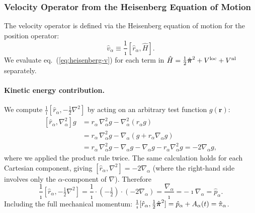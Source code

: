 \subsubsection{Velocity Operator from the Heisenberg Equation of Motion}
\label{sec:velocity-eom}

The velocity operator is defined via the Heisenberg equation of
motion for the position operator:
\begin{equation}
  \hat{v}_\alpha
  \equiv \frac{1}{\imath}\left[\hat{r}_\alpha,\hat{H}\right].
  \label{eq:heisenberg-v}
\end{equation}
We evaluate eq.~(\ref{eq:heisenberg-v}) for each term in
$\hat{H} = \frac{1}{2}\hat{\boldsymbol{\pi}}^2 + V^{\mathrm{loc}} + V^{\mathrm{nl}}$ separately.

\paragraph{Kinetic energy contribution.}
We compute $\frac{1}{\imath}[\hat{r}_\alpha, -\frac{1}{2}\nabla^2]$
by acting on an arbitrary test function $g(\mathbf{r})$:
\begin{align}
  \left[\hat{r}_\alpha,\nabla_\alpha^2\right]g
  &= r_\alpha\,\nabla_\alpha^2 g
   - \nabla_\alpha^2(r_\alpha g)
  \nonumber \\
  &= r_\alpha\,\nabla_\alpha^2 g
   - \nabla_\alpha\!\left(g + r_\alpha\nabla_\alpha g\right)
  \nonumber \\
  &= r_\alpha\,\nabla_\alpha^2 g
   - \nabla_\alpha g
   - \nabla_\alpha g
   - r_\alpha\nabla_\alpha^2 g
   = -2\nabla_\alpha g,
  \label{eq:comm-r-nabla2}
\end{align}
where we applied the product rule twice.
The same calculation holds for each Cartesian component, giving
$[\hat{r}_\alpha,\nabla^2] = -2\nabla_\alpha$ (where the right-hand
side involves only the $\alpha$-component of $\nabla$).
Therefore
\begin{equation}
  \frac{1}{\imath}
  \!\left[\hat{r}_\alpha,{-\tfrac{1}{2}\nabla^2}\right]
  = \frac{1}{\imath}\cdot(-\tfrac{1}{2})\cdot(-2\nabla_\alpha)
  = \frac{\nabla_\alpha}{\imath}
  = -\imath\nabla_\alpha = \hat{p}_\alpha.
  \label{eq:comm-r-T}
\end{equation}
Including the full mechanical momentum:
$\frac{1}{\imath}[\hat{r}_\alpha, \frac{1}{2}\hat{\boldsymbol{\pi}}^2]
= \hat{p}_\alpha + A_\alpha(t) = \hat{\pi}_\alpha$.


